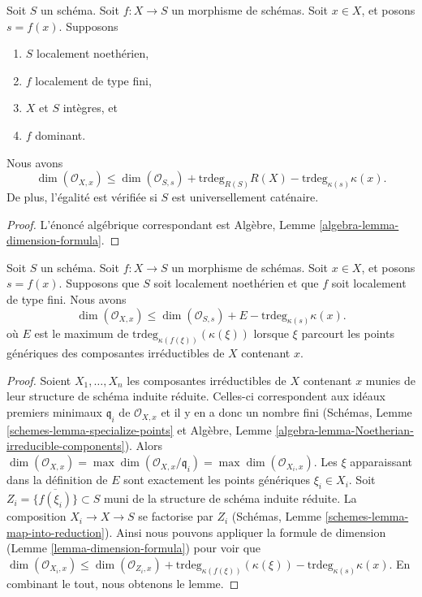 \begin{lemma}
\label{lemma-dimension-formula}
Soit $S$ un schéma.
Soit $f : X \to S$ un morphisme de schémas. Soit
$x \in X$, et posons $s = f(x)$.
Supposons
\begin{enumerate}
\item $S$ localement noethérien,
\item $f$ localement de type fini,
\item $X$ et $S$ intègres, et
\item $f$ dominant.
\end{enumerate}
Nous avons
\begin{equation}
\label{equation-dimension-formula}
\dim(\mathcal{O}_{X, x})
\leq
\dim(\mathcal{O}_{S, s}) + \text{trdeg}_{R(S)}R(X)
- \text{trdeg}_{\kappa(s)} \kappa(x).
\end{equation}
De plus, l'égalité est vérifiée si $S$ est universellement caténaire.
\end{lemma}

\begin{proof}
L'énoncé algébrique correspondant
est Algèbre, Lemme \ref{algebra-lemma-dimension-formula}.
\end{proof}

\begin{lemma}
\label{lemma-dimension-formula-general}
Soit $S$ un schéma. Soit $f : X \to S$ un morphisme de schémas. Soit $x \in X$,
et posons $s = f(x)$. Supposons que $S$ soit localement noethérien et que $f$
soit localement de type fini. Nous
avons
\begin{equation}
\label{equation-dimension-formula-general}
\dim(\mathcal{O}_{X, x})
\leq
\dim(\mathcal{O}_{S, s}) + E - \text{trdeg}_{\kappa(s)} \kappa(x).
\end{equation}
où $E$ est le maximum de $\text{trdeg}_{\kappa(f(\xi))}(\kappa(\xi))$ lorsque $\xi$ parcourt les
points génériques des composantes irréductibles de $X$ contenant
$x$.
\end{lemma}

\begin{proof}
Soient $X_1, \ldots, X_n$ les composantes irréductibles de $X$
contenant $x$ munies de leur
structure de schéma induite réduite. Celles-ci
correspondent aux idéaux premiers minimaux
$\mathfrak q_i$ de $\mathcal{O}_{X, x}$ et il y en
a donc un nombre fini (Schémas, Lemme \ref{schemes-lemma-specialize-points} et
Algèbre,
Lemme \ref{algebra-lemma-Noetherian-irreducible-components}). Alors $\dim(\mathcal{O}_{X, x}) = \max \dim(\mathcal{O}_{X, x}/\mathfrak q_i)
= \max \dim(\mathcal{O}_{X_i, x})$. Les $\xi$
apparaissant dans la définition de $E$ sont exactement les
points génériques $\xi_i \in X_i$. Soit $Z_i = \overline{\{f(\xi_i)\}} \subset S$ muni de la
structure de schéma induite réduite.
La composition $X_i \to X \to S$ se factorise
par $Z_i$ (Schémas, Lemme \ref{schemes-lemma-map-into-reduction}).
Ainsi nous pouvons appliquer
la formule de dimension (Lemme \ref{lemma-dimension-formula})
pour voir que $\dim(\mathcal{O}_{X_i, x}) \leq \dim(\mathcal{O}_{Z_i, x}) +
\text{trdeg}_{\kappa(f(\xi))}(\kappa(\xi)) -
\text{trdeg}_{\kappa(s)} \kappa(x)$.
En combinant le tout, nous obtenons le lemme.
\end{proof}

